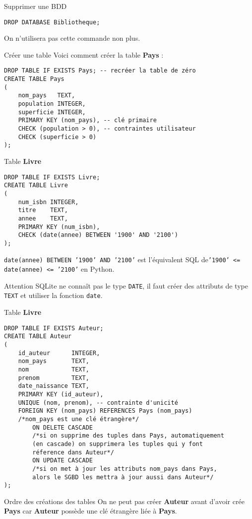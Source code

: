 \documentclass[10pt]{beamer}
\begin{document}
\begin{frame}[fragile]{Supprimer une BDD}

	\begin{verbatim}
DROP DATABASE Bibliotheque;
	\end{verbatim}
\pause
	On n'utilisera pas cette commande non plus.
\end{frame}

\begin{frame}[fragile]{Créer une table}
Voici comment créer la table \textbf{Pays} :

\begin{verbatim}
DROP TABLE IF EXISTS Pays; -- recréer la table de zéro
CREATE TABLE Pays
(
    nom_pays   TEXT,
    population INTEGER,
    superficie INTEGER,
    PRIMARY KEY (nom_pays), -- clé primaire
    CHECK (population > 0), -- contraintes utilisateur
    CHECK (superficie > 0)
);
\end{verbatim}

\end{frame}

\begin{frame}[fragile]{Table \textbf{Livre}}


\begin{verbatim}
DROP TABLE IF EXISTS Livre;
CREATE TABLE Livre
(
    num_isbn INTEGER,
    titre    TEXT,
    annee    TEXT,
    PRIMARY KEY (num_isbn),
    CHECK (date(annee) BETWEEN '1900' AND '2100')
);
\end{verbatim}
\pause
\texttt{date(annee) BETWEEN '1900' AND '2100'} est l'équivalent SQL de\texttt{'1900' <= date(annee) <= '2100'} en Python.\pause
\begin{alertblock}{Attention}
SQLite ne connaît pas le type \texttt{DATE}, il faut créer des attributs de type \texttt{TEXT} et utiliser la fonction \texttt{date}.
\end{alertblock}
\end{frame}
\begin{frame}[fragile]{Table \textbf{Livre}}
\begin{verbatim}
DROP TABLE IF EXISTS Auteur;
CREATE TABLE Auteur
(
    id_auteur      INTEGER,
    nom_pays       TEXT,
    nom            TEXT,
    prenom         TEXT,
    date_naissance TEXT,
    PRIMARY KEY (id_auteur),
    UNIQUE (nom, prenom), -- contrainte d'unicité
    FOREIGN KEY (nom_pays) REFERENCES Pays (nom_pays)
    /*nom_pays est une clé étrangère*/
        ON DELETE CASCADE
        /*si on supprime des tuples dans Pays, automatiquement
        (en cascade) on supprimera les tuples qui y font
        réference dans Auteur*/
        ON UPDATE CASCADE
        /*si on met à jour les attributs nom_pays dans Pays,
        alors le SGBD les mettra à jour aussi dans Auteur*/
);\end{verbatim}
\end{frame}
\begin{frame}{Ordre des créations des tables}
	On ne peut pas créer \textbf{Auteur} avant d'avoir crée \textbf{Pays} car \textbf{Auteur} possède une clé étrangère liée à \textbf{Pays}.
\end{frame}
\end{document}
